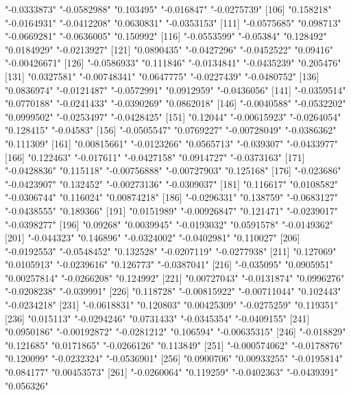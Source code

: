\begin{Schunk}
\begin{Soutput}
[101] "-0.0333873"   "-0.0582988"   "0.103495"     "-0.016847"    "-0.0275739"  
[106] "0.158218"     "-0.0164931"   "-0.0412208"   "0.0630831"    "-0.0353153"  
[111] "-0.0575685"   "0.098713"     "-0.0669281"   "-0.0636005"   "0.150992"    
[116] "-0.0553599"   "-0.05384"     "0.128492"     "0.0184929"    "-0.0213927"  
[121] "0.0890435"    "-0.0427296"   "-0.0452522"   "0.09416"      "-0.00426671" 
[126] "-0.0586933"   "0.111846"     "-0.0134841"   "-0.0435239"   "0.205476"    
[131] "0.0327581"    "-0.00748341"  "0.0647775"    "-0.0227439"   "-0.0480752"  
[136] "0.0836974"    "-0.0121487"   "-0.0572991"   "0.0912959"    "-0.0436056"  
[141] "-0.0359514"   "0.0770188"    "-0.0241433"   "-0.0390269"   "0.0862018"   
[146] "-0.0040588"   "-0.0532202"   "0.0999502"    "-0.0253497"   "-0.0428425"  
[151] "0.12044"      "-0.00615923"  "-0.0264054"   "0.128415"     "-0.04583"    
[156] "-0.0505547"   "0.0769227"    "-0.00728049"  "-0.0386362"   "0.111309"    
[161] "0.00815661"   "-0.0123266"   "0.0565713"    "-0.039307"    "-0.0433977"  
[166] "0.122463"     "-0.017611"    "-0.0427158"   "0.0914727"    "-0.0373163"  
[171] "-0.0428836"   "0.115118"     "-0.00756888"  "-0.00727903"  "0.125168"    
[176] "-0.023686"    "-0.0423907"   "0.132452"     "-0.00273136"  "-0.0309037"  
[181] "0.116617"     "0.0108582"    "-0.0306744"   "0.116024"     "0.00874218"  
[186] "-0.0296331"   "0.138759"     "-0.0683127"   "-0.0438555"   "0.189366"    
[191] "0.0151989"    "-0.00926847"  "0.121471"     "-0.0239017"   "-0.0398277"  
[196] "0.09268"      "0.0039945"    "-0.0193032"   "0.0591578"    "-0.0149362"  
[201] "-0.044323"    "0.146896"     "-0.0324002"   "-0.0402981"   "0.110027"    
[206] "-0.0192553"   "-0.0548452"   "0.132528"     "-0.0207119"   "-0.0277938"  
[211] "0.127069"     "0.0105913"    "-0.0239616"   "0.126773"     "-0.0387041"  
[216] "-0.035095"    "0.0905951"    "0.00257814"   "-0.0266208"   "0.124992"    
[221] "0.00727043"   "-0.0131874"   "0.0996276"    "-0.0208238"   "-0.039991"   
[226] "0.118728"     "-0.00815922"  "-0.00711044"  "0.102443"     "-0.0234218"  
[231] "-0.0618831"   "0.120803"     "0.00425309"   "-0.0275259"   "0.119351"    
[236] "0.015113"     "-0.0294246"   "0.0731433"    "-0.0345354"   "-0.0409155"  
[241] "0.0950186"    "-0.00192872"  "-0.0281212"   "0.106594"     "-0.00635315" 
[246] "-0.018829"    "0.121685"     "0.0171865"    "-0.0266126"   "0.113849"    
[251] "-0.000574062" "-0.0178876"   "0.120099"     "-0.0232324"   "-0.0536901"  
[256] "0.0900706"    "0.00933255"   "-0.0195814"   "0.084177"     "0.00453573"  
[261] "-0.0260064"   "0.119259"     "-0.0402363"   "-0.0439391"   "0.056326"    

\end{Soutput}
\end{Schunk}
